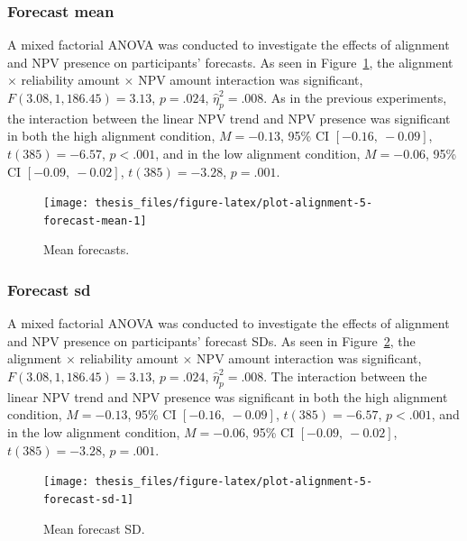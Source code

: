 \documentclass[a4paper, nobind, dvipsnames]{templates/ociamthesis}
\theoremstyle{definition}
\theoremstyle{definition}
\theoremstyle{definition}
\theoremstyle{definition}
\theoremstyle{remark}
\begin{document}
\subsubsection{Forecast mean}

A mixed factorial ANOVA was conducted to investigate the effects of alignment
and NPV presence on participants' forecasts. As seen in
Figure~\ref{fig:plot-alignment-5-forecast-mean}, the alignment \(\times\)
reliability amount \(\times\) NPV amount interaction was significant,
\(F(3.08, 1,186.45) = 3.13\), \(p = .024\), \(\hat{\eta}^2_p = .008\).
As in the previous experiments, the interaction between the linear
NPV trend and NPV presence was significant in both the high alignment condition,
\(M = -0.13\), 95\% CI \([-0.16,~-0.09]\), \(t(385) = -6.57\), \(p < .001\), and in the
low alignment condition,
\(M = -0.06\), 95\% CI \([-0.09,~-0.02]\), \(t(385) = -3.28\), \(p = .001\).



\begin{figure}
\texttt{[image: thesis\_files/figure-latex/plot-alignment-5-forecast-mean-1]} \caption{Mean forecasts.}\label{fig:plot-alignment-5-forecast-mean}
\end{figure}

\hypertarget{forecast-sd-alignment-5}{%
\subsubsection{Forecast sd}\label{forecast-sd-alignment-5}}

A mixed factorial ANOVA was conducted to investigate the effects of alignment
and NPV presence on participants' forecast SDs. As seen in
Figure~\ref{fig:plot-alignment-5-forecast-sd}, the alignment \(\times\)
reliability amount \(\times\) NPV amount interaction was significant,
\(F(3.08, 1,186.45) = 3.13\), \(p = .024\), \(\hat{\eta}^2_p = .008\).
The interaction between the linear NPV trend and NPV presence was significant in
both the high alignment condition,
\(M = -0.13\), 95\% CI \([-0.16,~-0.09]\), \(t(385) = -6.57\), \(p < .001\), and in the
low alignment condition,
\(M = -0.06\), 95\% CI \([-0.09,~-0.02]\), \(t(385) = -3.28\), \(p = .001\).



\begin{figure}
\texttt{[image: thesis\_files/figure-latex/plot-alignment-5-forecast-sd-1]} \caption{Mean forecast SD.}\label{fig:plot-alignment-5-forecast-sd}
\end{figure}
\end{document}
